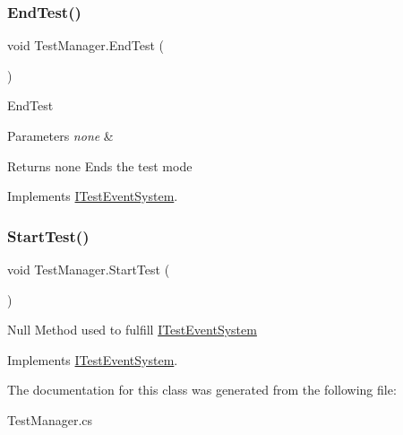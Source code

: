 \subsubsection{\texorpdfstring{End\+Test()}{EndTest()}}
{\footnotesize\ttfamily void Test\+Manager.\+End\+Test (\begin{DoxyParamCaption}{ }\end{DoxyParamCaption})\hspace{0.3cm}{\ttfamily [inline]}}

End\+Test 
\begin{DoxyParams}{Parameters}
{\em none} & \\
\hline
\end{DoxyParams}
\begin{DoxyReturn}{Returns}
none Ends the test mode 
\end{DoxyReturn}


Implements \mbox{\hyperlink{interface_i_test_event_system_ae8eda94179d81c4c839a32432216df7b}{I\+Test\+Event\+System}}.

\mbox{\label{class_test_manager_a74fe528d0e18c4cca484bca002dc4f2b}} 
\subsubsection{\texorpdfstring{Start\+Test()}{StartTest()}}
{\footnotesize\ttfamily void Test\+Manager.\+Start\+Test (\begin{DoxyParamCaption}{ }\end{DoxyParamCaption})\hspace{0.3cm}{\ttfamily [inline]}}

Null Method used to fulfill \mbox{\hyperlink{interface_i_test_event_system}{I\+Test\+Event\+System}} 

Implements \mbox{\hyperlink{interface_i_test_event_system_aefeb7857cc94ecb2bacb47975f6474bb}{I\+Test\+Event\+System}}.



The documentation for this class was generated from the following file\+:\begin{DoxyCompactItemize}
\item 
Test\+Manager.\+cs\end{DoxyCompactItemize}
